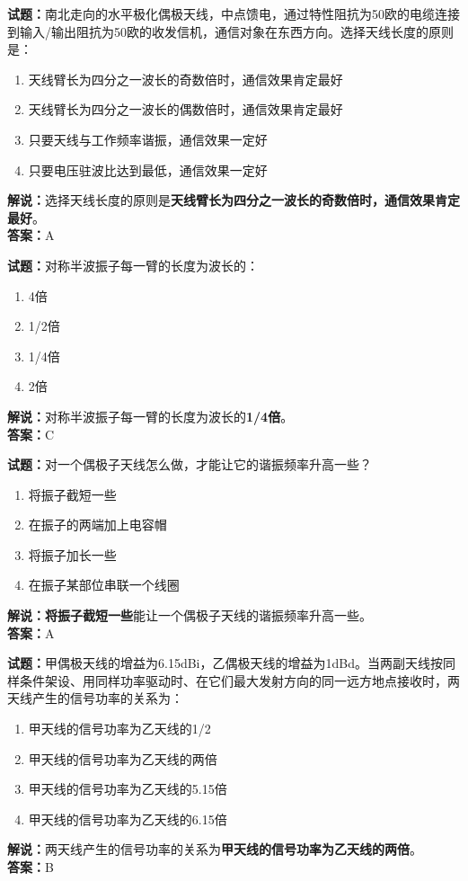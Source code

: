 \documentclass{ctexbook}
\begin{document}

\bigskip


\noindent\textbf{试题：}南北走向的水平极化偶极天线，中点馈电，通过特性阻抗为50欧的电缆连接到输入/输出阻抗为50欧的收发信机，通信对象在东西方向。选择天线长度的原则是：
\begin{enumerate}[leftmargin=3em]
\item 天线臂长为四分之一波长的奇数倍时，通信效果肯定最好
\item 天线臂长为四分之一波长的偶数倍时，通信效果肯定最好
\item 只要天线与工作频率谐振，通信效果一定好
\item 只要电压驻波比达到最低，通信效果一定好
\end{enumerate}
\noindent\textbf{解说：}选择天线长度的原则是\textbf{天线臂长为四分之一波长的奇数倍时，通信效果肯定最好}。\\\noindent\textbf{答案：}A



\bigskip


\noindent\textbf{试题：}对称半波振子每一臂的长度为波长的：
\begin{enumerate}[leftmargin=3em]
\item 4倍
\item 1/2倍
\item 1/4倍
\item 2倍
\end{enumerate}
\noindent\textbf{解说：}对称半波振子每一臂的长度为波长的\textbf{1/4倍}。\\\noindent\textbf{答案：}C

\bigskip


\noindent\textbf{试题：}对一个偶极子天线怎么做，才能让它的谐振频率升高一些？
\begin{enumerate}[leftmargin=3em]
\item 将振子截短一些
\item 在振子的两端加上电容帽
\item 将振子加长一些
\item 在振子某部位串联一个线圈
\end{enumerate}
\noindent\textbf{解说：}\textbf{将振子截短一些}能让一个偶极子天线的谐振频率升高一些。\\\noindent\textbf{答案：}A



\bigskip


\noindent\textbf{试题：}甲偶极天线的增益为6.15dBi，乙偶极天线的增益为1dBd。当两副天线按同样条件架设、用同样功率驱动时、在它们最大发射方向的同一远方地点接收时，两天线产生的信号功率的关系为：
\begin{enumerate}[leftmargin=3em]
\item 甲天线的信号功率为乙天线的1/2
\item 甲天线的信号功率为乙天线的两倍
\item 甲天线的信号功率为乙天线的5.15倍
\item 甲天线的信号功率为乙天线的6.15倍
\end{enumerate}
\noindent\textbf{解说：}两天线产生的信号功率的关系为\textbf{甲天线的信号功率为乙天线的两倍}。\\\noindent\textbf{答案：}B
\end{document}
